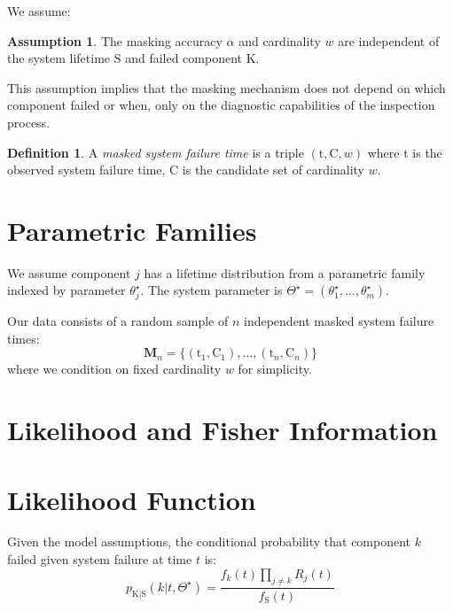 \documentclass[12pt]{article}
\newcommand{\RV}[1]{\mathrm{#1}}
\newcommand{\sv}{\RV{S}}           %
\newcommand{\cand}{\RV{C}}         %
\newcommand{\ti}{\mathrm{t}}       %
\newcommand{\sysparam}{\Theta}
\newcommand{\tparam}[1]{{#1}^{\star}}  %
\newcommand{\mfs}{\mathbf{M}_n}
\newcommand{\pdf}{f}
\newcommand{\pmf}{p}
\newcommand{\srv}{R}
\newcommand{\spdf}{\pdf_{\sv}}
\theoremstyle{definition}
\newtheorem{definition}[theorem]{Definition}
\newtheorem{assumption}[theorem]{Assumption}
\begin{document}
We assume:

\begin{assumption}
\label{asm:alpha_indep}
The masking accuracy $\alpha$ and cardinality $w$ are independent of the system lifetime $\sv$ and failed component $\RV{K}$.
\end{assumption}

This assumption implies that the masking mechanism does not depend on which component failed or when, only on the diagnostic capabilities of the inspection process.

\begin{definition}
A \emph{masked system failure time} is a triple $(\ti, \cand, w)$ where $\ti$ is the observed system failure time, $\cand$ is the candidate set of cardinality $w$.
\end{definition}

\section{Parametric Families}

We assume component $j$ has a lifetime distribution from a parametric family indexed by parameter $\tparam{\theta}_j$. The system parameter is $\tparam{\sysparam} = (\tparam{\theta}_1, \ldots, \tparam{\theta}_m)$.

Our data consists of a random sample of $n$ independent masked system failure times:
\begin{equation}
\mfs = \{(\ti_1, \cand_1), \ldots, (\ti_n, \cand_n)\}
\end{equation}
where we condition on fixed cardinality $w$ for simplicity.

\section{Likelihood and Fisher Information}
\label{sec:general_fim}

\section{Likelihood Function}

Given the model assumptions, the conditional probability that component $k$ failed given system failure at time $t$ is:
\begin{equation}
\label{eq:component_failure_prob}
\pmf_{\RV{K} | \sv}(k | t, \tparam{\sysparam}) = \frac{\pdf_k(t) \prod_{j \neq k} \srv_j(t)}{\spdf(t)}
\end{equation}
\end{document}
